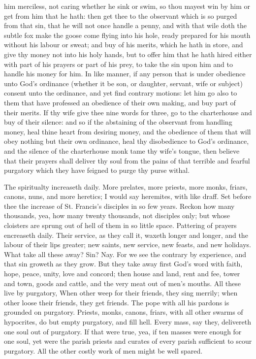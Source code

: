 him merciless, not caring whether he sink or swim, so thou 
mayest win by him or get from him that he hath: then get 
thee to the observant which is so purged from that sin, 
that he will not once handle a penny, and with that wile 
doth the subtle fox make the goose come flying into his 
hole, ready prepared for his mouth without his labour or 
sweat; and buy of his merits, which he hath in store, and 
give thy money not into his holy hands, but to offer him 
that he hath hired either with part of his prayers or part 
of his prey, to take the sin upon him and to handle his 
money for him. In like manner, if any person that is under
obedience unto God's ordinance (whether it be son, or 
daughter, servant, wife or subject) consent unto the ordinance,
and yet find contrary motions: let him go also to 
them that have professed an obedience of their own making, 
and buy part of their merits. If thy wife give thee nine 
words for three, go to the charterhouse and buy of their 
silence: and so if the abstaining of the observant from 
handling money, heal thine heart from desiring money, 
and the obedience of them that will obey nothing but their 
own ordinance, heal thy disobedience to God's ordinance, 
and the silence of the charterhouse monk tame thy wife's 
tongue, then believe that their prayers shall deliver thy 
soul from the pains of that terrible and fearful purgatory 
which they have feigned to purge thy purse withal. 

The spiritualty increaseth daily. More prelates, more 
priests, more monks, friars, canons, nuns, and more heretics; 
I would say heremites, with like draff. Set before thee the increase
of St. Francis's disciples in so few years. Reckon how 
many thousands, yea, how many twenty thousands, not disciples
only; but whose cloisters are sprung out of hell of 
them in so little space. Pattering of prayers encreaseth 
daily. Their service, as they call it, waxeth longer and 
longer, and the labour of their lips greater; new saints, 
new service, new feasts, and new holidays. What take 
all these away? Sin? Nay. For we see the contrary 
by experience, and that sin groweth as they grow. But 
they take away first God's word with faith, hope, peace, 
unity, love and concord; then house and land, rent and 
fee, tower and town, goods and cattle, and the very meat 
out of men's mouths. All these live by purgatory, When 
other weep for their friends, they sing merrily; when 
other loose their friends, they get friends. The pope with 
all his pardons is grounded on purgatory. Priests, monks, 
canons, friars, with all other swarms of hypocrites, do but 
empty purgatory, and fill hell. Every mass, say they, delivereth
one soul out of purgatory. If that were true, 
yea, if ten masses were enough for one soul, yet were the 
parish priests and curates of every parish sufficient to 
scour purgatory. All the other costly work of men might 
be well spared. 



